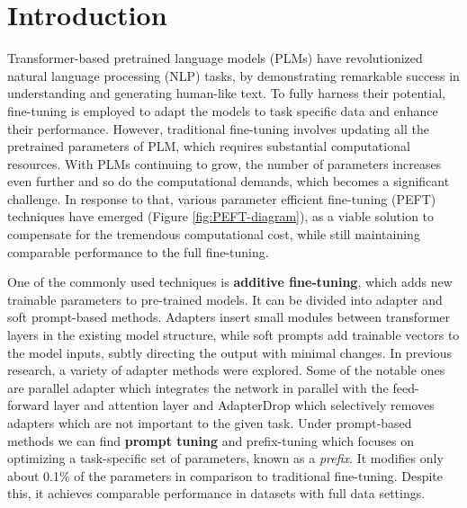 \documentclass[fleqn,moreauthors,10pt]{ds_report}
\affiliation{\textit{Advisors: Aleš Žagar}}
\begin{document}
\flushbottom 

\maketitle 

\thispagestyle{empty} 


\section*{Introduction}
Transformer-based pretrained language models (PLMs) have revolutionized natural language processing (NLP) tasks, by demonstrating remarkable success in understanding and generating human-like text. To fully harness their potential, fine-tuning is employed to adapt the models to task specific data and enhance their performance. However, traditional fine-tuning involves updating all the pretrained parameters of PLM, which requires substantial computational resources. With PLMs continuing to grow, the number of parameters increases even further and so do the computational demands, which becomes a significant challenge. In response to that, various parameter efficient fine-tuning (PEFT) techniques have emerged (Figure \ref{fig:PEFT-diagram}), as a viable solution to compensate for the tremendous computational cost, while still maintaining comparable performance to the full fine-tuning.

One of the commonly used techniques is \textbf{additive fine-tuning}, which adds new trainable parameters to pre-trained models. It can be divided into adapter and soft prompt-based methods. Adapters insert small modules between transformer layers in the existing model structure, while soft prompts add trainable vectors to the model inputs, subtly directing the output with minimal changes. In previous research, a variety of adapter methods were explored. Some of the notable ones are parallel adapter \cite{he2021towards} which integrates the network in parallel with the feed-forward layer and attention layer and AdapterDrop \cite{ruckle2020adapterdrop} which selectively removes adapters which are not important to the given task. Under prompt-based methods we can find \textbf{prompt tuning} and prefix-tuning \cite{li2021prefix} which focuses on optimizing a task-specific set of parameters, known as a \textit{prefix}. It modifies only about 0.1\% of the parameters in comparison to traditional fine-tuning. Despite this, it achieves comparable performance in datasets with full data settings.
\end{document}

